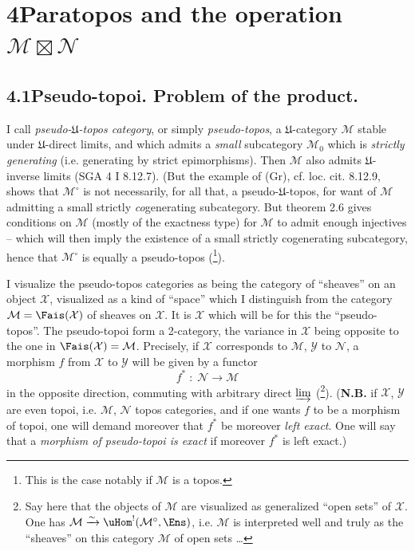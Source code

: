 

\section*{4\quad Paratopos and the operation $\mathcal{M}\boxtimes\mathcal{N}$}

\subsection*{4.1\quad Pseudo-topoi. Problem of the product.}

I call \textit{pseudo-$\mathfrak{U}$-topos category}, or simply \textit{pseudo-topos}, a $\mathfrak{U}$-category $\mathcal{M}$ stable under $\mathfrak{U}$-direct limits, and which admits a \textit{small} subcategory $\mathcal{M}_0$ which is \textit{strictly generating} (i.e. generating by strict epimorphisms). Then $\mathcal{M}$ also admits $\mathfrak{U}$-inverse limits (SGA 4 I 8.12.7). (But the example of (Gr), cf. loc. cit. 8.12.9, shows that $\mathcal{M}^\circ$ is not necessarily, for all that, a pseudo-$\mathfrak{U}$-topos, for want of $\mathcal{M}$ admitting a small strictly \textit{co}generating subcategory. But theorem 2.6 gives conditions on $\mathcal{M}$ (mostly of the exactness type) %
for $\mathcal{M}$ to admit enough injectives -- which will then imply the existence of a small strictly cogenerating subcategory, hence that $\mathcal{M}^\circ$ is equally a pseudo-topos (\footnote{This is the case notably if $\mathcal{M}$ is a topos.}).

I visualize the pseudo-topos categories as being the category of ``sheaves'' on an object $\mathcal{X}$, visualized as a kind of ``space'' which I distinguish from the category $\mathcal{M}=\Fais(\mathcal{X})$ of sheaves on $\mathcal{X}$. It is $\mathcal{X}$ which will be for this the ``pseudo-topos''. The pseudo-topoi form a 2-category, the variance in $\mathcal{X}$ being opposite to the one in $\Fais(\mathcal{X})=\mathcal{M}$. Precisely, if $\mathcal{X}$ corresponds to $\mathcal{M}$, $\mathcal{Y}$ to $\mathcal{N}$, a morphism $f$ from $\mathcal{X}$ to $\mathcal{Y}$ will be given by a functor
\[
f^* \;:\; \mathcal{N} \longrightarrow \mathcal{M}
\tag*{(4.1.1)}
\]
in the opposite direction, commuting with arbitrary direct $\varinjlim$ (\footnote{Say here that the objects of $\mathcal{M}$ are visualized as generalized ``open sets'' of $\mathcal{X}$. One has $\mathcal{M}\xrightarrow{\sim}\uHom^!(\mathcal{M}^\circ,\Ens)$, i.e. $\mathcal{M}$ is interpreted well and truly as the ``sheaves'' on this category $\mathcal{M}$ of open sets \ldots}). (\textbf{N.B.} if $\mathcal{X}$, $\mathcal{Y}$ are even topoi, i.e. $\mathcal{M}$, $\mathcal{N}$ topos categories, and if one wants $f$ to be a morphism of topoi, one will demand moreover that $f^*$ be moreover \textit{left exact}. One will say that a \textit{morphism of pseudo-topoi is exact} if moreover $f^*$ is left exact.)

